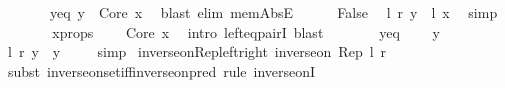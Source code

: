 \begin{isabellebody}
\ \ \ \ \ \ \ y{\isacharunderscore}{\kern0pt}eq{\isacharcolon}{\kern0pt}\ {\isachardoublequoteopen}y\ {\isacharequal}{\kern0pt}\ {\isasymlangle}Core{\isacharcomma}{\kern0pt}\ x{\isasymrangle}{\isachardoublequoteclose}\ \isamarkupfalse%
\ {\isacharparenleft}{\kern0pt}blast\ elim{\isacharcolon}{\kern0pt}\ mem{\isacharunderscore}{\kern0pt}AbsE{\isacharparenright}{\kern0pt}\isanewline
\ \ \ \ \isamarkupfalse%
\ False\ \isamarkupfalse%
\ {\isachardoublequoteopen}l\ {\isacharparenleft}{\kern0pt}r\ y{\isacharparenright}{\kern0pt}\ {\isacharequal}{\kern0pt}\ l\ x{\isachardoublequoteclose}\ \isamarkupfalse%
\ simp\isanewline
\ \ \ \ \isamarkupfalse%
\ \isamarkupfalse%
\ x{\isacharunderscore}{\kern0pt}props\ \isamarkupfalse%
\ {\isachardoublequoteopen}{\isachardot}{\kern0pt}{\isachardot}{\kern0pt}{\isachardot}{\kern0pt}\ {\isacharequal}{\kern0pt}\ {\isasymlangle}Core{\isacharcomma}{\kern0pt}\ x{\isasymrangle}{\isachardoublequoteclose}\ \isamarkupfalse%
\ {\isacharparenleft}{\kern0pt}intro\ left{\isacharunderscore}{\kern0pt}eq{\isacharunderscore}{\kern0pt}pairI{\isacharparenright}{\kern0pt}\ blast\isanewline
\ \ \ \ \isamarkupfalse%
\ \isamarkupfalse%
\ y{\isacharunderscore}{\kern0pt}eq\ \isamarkupfalse%
\ {\isachardoublequoteopen}{\isachardot}{\kern0pt}{\isachardot}{\kern0pt}{\isachardot}{\kern0pt}\ {\isacharequal}{\kern0pt}\ y{\isachardoublequoteclose}\ \isacommand{{\isachardot}{\kern0pt}{\isachardot}{\kern0pt}}\isamarkupfalse%
\isanewline
\ \ \ \ \isamarkupfalse%
\ \isamarkupfalse%
\ {\isachardoublequoteopen}l\ {\isacharparenleft}{\kern0pt}r\ y{\isacharparenright}{\kern0pt}\ {\isacharequal}{\kern0pt}\ y{\isachardoublequoteclose}\ \isacommand{{\isachardot}{\kern0pt}}\isamarkupfalse%
\isanewline
\ \ \isamarkupfalse%
\ simp\isanewline
{}\isamarkupfalse%
%
\endisatagproof
{\isafoldproof}%
%
\isadelimproof
\isanewline
%
\endisadelimproof
\isanewline
{}\isamarkupfalse%
\ inverse{\isacharunderscore}{\kern0pt}on{\isacharunderscore}{\kern0pt}Rep{\isacharunderscore}{\kern0pt}left{\isacharunderscore}{\kern0pt}right{\isacharcolon}{\kern0pt}\ {\isachardoublequoteopen}inverse{\isacharunderscore}{\kern0pt}on\ Rep\ l\ r{\isachardoublequoteclose}\isanewline
%
\isadelimproof
%
\endisadelimproof
%
\isatagproof
{}\isamarkupfalse%
\ {\isacharparenleft}{\kern0pt}subst\ inverse{\isacharunderscore}{\kern0pt}on{\isacharunderscore}{\kern0pt}set{\isacharunderscore}{\kern0pt}iff{\isacharunderscore}{\kern0pt}inverse{\isacharunderscore}{\kern0pt}on{\isacharunderscore}{\kern0pt}pred{\isacharcomma}{\kern0pt}\ rule\ inverse{\isacharunderscore}{\kern0pt}onI{\isacharparenright}{\kern0pt}\isanewline

\end{isabellebody}
